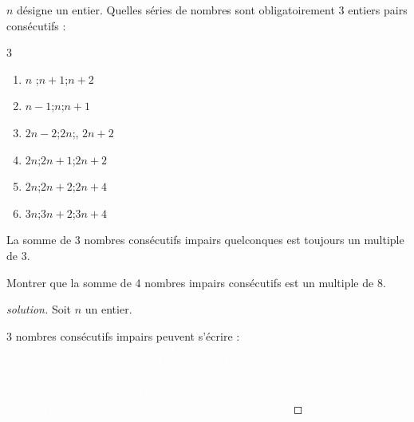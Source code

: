 \documentclass[main.tex]{subfiles}
\begin{document}
\begin{exercise}$n$ désigne un entier.
	Quelles séries de nombres sont obligatoirement 3 entiers pairs consécutifs :
	\begin{multicols}{3} 
		\begin{enumerate}[label={\alph*)}, leftmargin=*] 
			\item $n$ ;\quad $n+1$;\quad $n+2$
			\item $n-1$;\quad $n$;\quad $n+1$
			\item $2n-2$;\quad $2n$;\quad, $2n+2$
			\item $2n$;\quad $2n+1$;\quad $2n+2$
			\item $2n$;\quad $2n+2$;\quad $2n+4$
			\item $3n$;\quad $3n+2$;\quad $3n+4$
		\end{enumerate}
	\end{multicols}
\end{exercise} 
\noindent\parbox[t][][t]{0.47\columnwidth}{
	\begin{example} La somme de 3 nombres consécutifs impairs quelconques est toujours un multiple de 3.
	\end{example} 
}  
\parbox[t][][t]{0.47\columnwidth}{
	\begin{example}[à vous] Montrer que la somme de 4 nombres impairs consécutifs est un multiple de 8.
	\end{example}
}
\parbox[t][][t]{0.35\columnwidth}{ 
	\begin{proof}[solution] 
		
		Soit $n$ un entier.
		
		3 nombres consécutifs impairs peuvent s'écrire :\textcolor{white}{
		$$ 2n+1, \quad 2n+3,\quad 2n+5$$
		\begin{align*}
			&(2n+1)+(2n+3)+(2n+5)\\
			& = 6n+6\\
			&= 3(2n+2)
		\end{align*}
		3 est un facteur, la somme est toujours un multiple de 3.
		}
	\end{proof} 
} 
\end{document}
